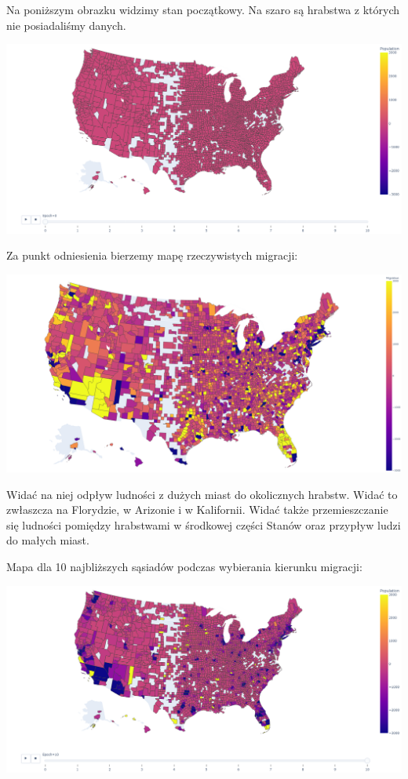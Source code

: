 \documentclass[a4paper,12pt]{article}
\begin{document}
Na poniższym obrazku widzimy stan początkowy. Na szaro są hrabstwa z których nie posiadaliśmy danych. 
\begin{center}
    \includegraphics*[width=15cm]{./pictures/base_population.png}
\end{center}

Za punkt odniesienia bierzemy mapę rzeczywistych migracji:
\begin{center}
    \includegraphics*[width=15cm]{./pictures/real_population.png}
\end{center}
Widać na niej odpływ ludności z dużych miast do okolicznych hrabstw. Widać to zwłaszcza na Florydzie, w Arizonie i w Kalifornii. Widać także przemieszczanie się ludności pomiędzy hrabstwami w środkowej części Stanów oraz przypływ ludzi do małych miast.


Mapa dla 10 najbliższych sąsiadów podczas wybierania kierunku migracji:
\begin{center}
    \includegraphics*[width=15cm]{./pictures/population_k10.png}
\end{center}
\end{document}
